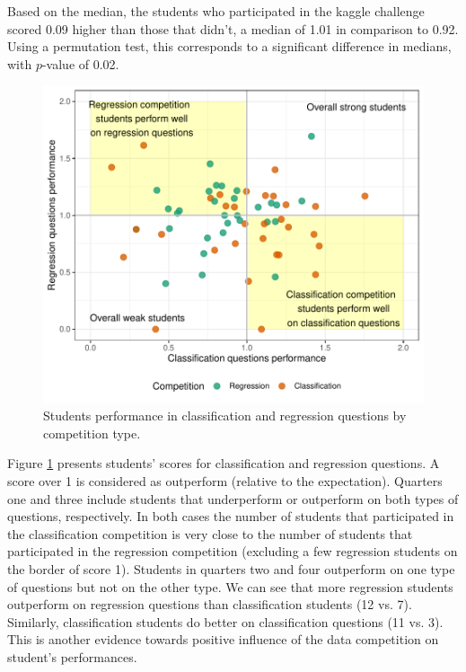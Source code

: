 \documentclass[12pt]{article}
\begin{document}
Based on the median, the students who participated in the kaggle
challenge scored 0.09 higher than those that didn't, a median of 1.01 in
comparison to 0.92. Using a permutation test, this corresponds to a
significant difference in medians, with \(p\)-value of 0.02.

\begin{figure}
\centering
\includegraphics{paper-kaggle_files/figure-latex/crossperformances-1.pdf}
\caption{\label{fig:crossperformances} Students performance in
classification and regression questions by competition type.}
\end{figure}

Figure \ref{fig:crossperformances} presents students' scores for
classification and regression questions. A score over 1 is considered as
outperform (relative to the expectation). Quarters one and three include
students that underperform or outperform on both types of questions,
respectively. In both cases the number of students that participated in
the classification competition is very close to the number of students
that participated in the regression competition (excluding a few
regression students on the border of score 1). Students in quarters two
and four outperform on one type of questions but not on the other type.
We can see that more regression students outperform on regression
questions than classification students (12 vs. 7). Similarly,
classification students do better on classification questions (11 vs.
3). This is another evidence towards positive influence of the data
competition on student's performances.
\end{document}
